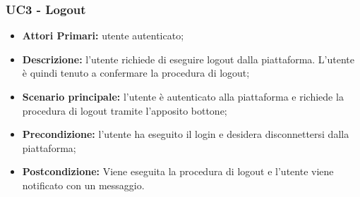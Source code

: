 \subsubsection{UC3 - Logout}
\begin{itemize}
	\item \textbf{Attori Primari:} utente autenticato;
	\item \textbf{Descrizione:} l'utente richiede di eseguire logout dalla piattaforma. L'utente è quindi tenuto a confermare la procedura di logout;
	\item \textbf{Scenario principale:} l'utente è autenticato alla piattaforma e richiede la procedura di logout tramite l'apposito bottone;
	\item \textbf{Precondizione:} l'utente ha eseguito il login e desidera disconnettersi dalla piattaforma;
	\item \textbf{Postcondizione:} Viene eseguita la procedura di logout e l'utente viene notificato con un messaggio.
\end{itemize}
